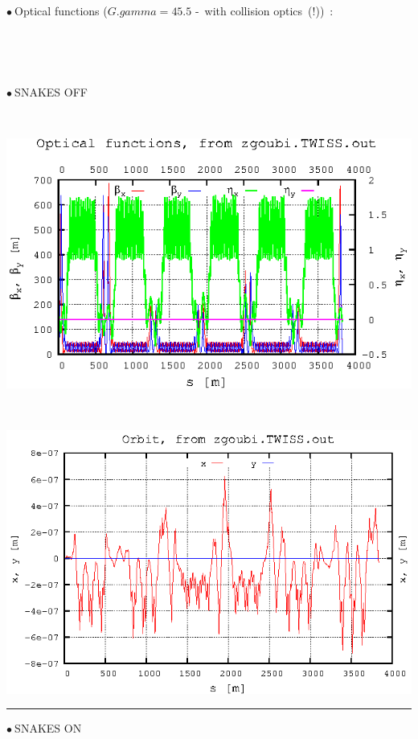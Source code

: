 \documentclass[10pt]{article}
\newcommand{\nib}{\noindent \ensuremath{\bullet~}}
\begin{document}
\clearpage

\nib Optical functions ($G.gamma=45.5$ -~with collision optics~(!))~:

~

~

\begin{minipage}{1.\linewidth}

\begin{minipage}{.49\linewidth}

\label{slide:optics}

\nib SNAKES OFF

~

\includegraphics*[width=.99\linewidth]{gnuplot_TWISS_btxy_snakesOff.eps} 

~

\includegraphics*[width=.99\linewidth]{gnuplot_TWISS_xy_snakesOff.eps} 


\end{minipage}
\begin{minipage}{.001\linewidth}
\rule{0.1mm}{18cm}
\end{minipage}
\begin{minipage}{.49\linewidth}
\nib SNAKES ON


\end{minipage}
\end{minipage}
\end{document}
